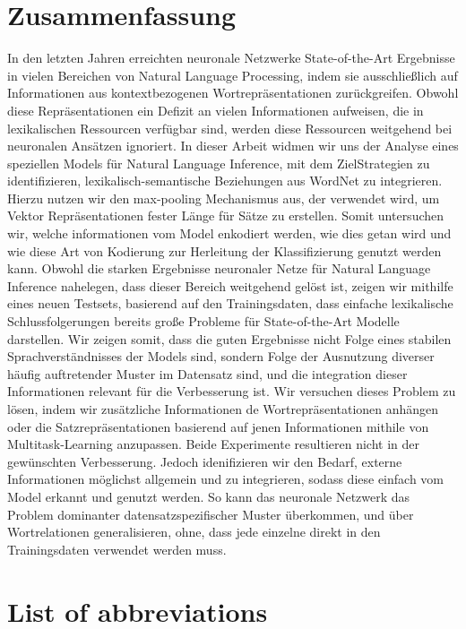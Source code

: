 \documentclass[article,type=msc,11pt,colorback,accentcolor=tud9c]{tudthesis}
\begin{document}
\section*{Zusammenfassung}
In den letzten Jahren erreichten neuronale Netzwerke State-of-the-Art Ergebnisse in vielen Bereichen von Natural Language Processing, indem sie ausschließlich auf Informationen aus kontextbezogenen Wortrepräsentationen zurückgreifen. Obwohl diese Repräsentationen ein Defizit an vielen Informationen aufweisen, die in lexikalischen Ressourcen verfügbar sind, werden diese Ressourcen weitgehend bei neuronalen Ansätzen ignoriert. In dieser Arbeit widmen wir uns der Analyse eines speziellen Models für Natural Language Inference, mit dem ZielStrategien zu identifizieren, lexikalisch-semantische Beziehungen aus WordNet zu integrieren. Hierzu nutzen wir den max-pooling Mechanismus aus, der verwendet wird, um Vektor Repräsentationen fester Länge für Sätze zu erstellen. Somit untersuchen wir, welche informationen vom Model enkodiert werden, wie dies getan wird und wie diese Art von Kodierung zur Herleitung der Klassifizierung genutzt werden kann. Obwohl die starken Ergebnisse neuronaler Netze für Natural Language Inference nahelegen, dass dieser Bereich  weitgehend gelöst ist, zeigen wir mithilfe eines neuen Testsets, basierend auf den Trainingsdaten, dass einfache lexikalische Schlussfolgerungen bereits große Probleme für State-of-the-Art Modelle darstellen.  Wir zeigen somit, dass die guten Ergebnisse nicht Folge eines stabilen Sprachverständnisses der Models sind, sondern Folge der Ausnutzung diverser häufig auftretender Muster im Datensatz sind, und die integration dieser Informationen relevant für die Verbesserung ist. Wir versuchen dieses Problem zu lösen, indem wir zusätzliche Informationen de Wortrepräsentationen anhängen oder die Satzrepräsentationen basierend auf jenen Informationen mithile von Multitask-Learning anzupassen. Beide Experimente resultieren nicht in der gewünschten Verbesserung. Jedoch idenifizieren wir den Bedarf, externe Informationen möglichst allgemein und zu integrieren, sodass diese einfach vom Model erkannt und genutzt werden. So kann das neuronale Netzwerk das Problem dominanter datensatzspezifischer Muster überkommen, und über Wortrelationen generalisieren, ohne, dass jede einzelne direkt in den Trainingsdaten verwendet werden muss.
\addtocounter{section}{0}

\newpage\cleardoublepage
\section*{List of abbreviations}
\addtocounter{section}{0}
\end{document}
